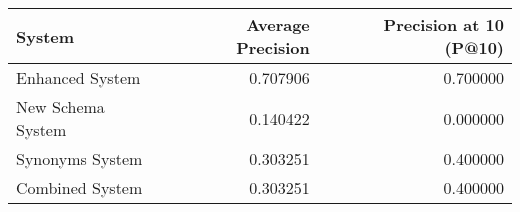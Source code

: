 \begin{tabular}{lrr}
\toprule
System & Average Precision & Precision at 10 (P@10) \\
\midrule
Enhanced System & 0.707906 & 0.700000 \\
New Schema System & 0.140422 & 0.000000 \\
Synonyms System & 0.303251 & 0.400000 \\
Combined System & 0.303251 & 0.400000 \\
\bottomrule
\end{tabular}
